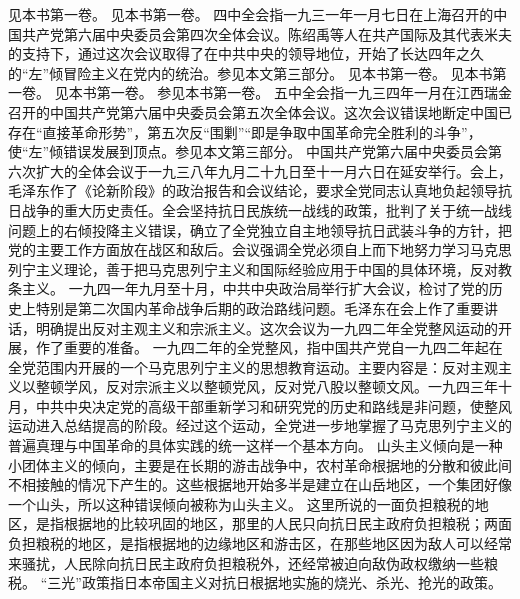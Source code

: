 \begin{maonote}
见本书第一卷。
见本书第一卷。
四中全会指一九三一年一月七日在上海召开的中国共产党第六届中央委员会第四次全体会议。陈绍禹等人在共产国际及其代表米夫的支持下，通过这次会议取得了在中共中央的领导地位，开始了长达四年之久的“左”倾冒险主义在党内的统治。参见本文第三部分。
见本书第一卷。
见本书第一卷。
见本书第一卷。
参见本书第一卷。
五中全会指一九三四年一月在江西瑞金召开的中国共产党第六届中央委员会第五次全体会议。这次会议错误地断定中国已存在“直接革命形势”，第五次反“围剿”“即是争取中国革命完全胜利的斗争”，使“左”倾错误发展到顶点。参见本文第三部分。
中国共产党第六届中央委员会第六次扩大的全体会议于一九三八年九月二十九日至十一月六日在延安举行。会上，毛泽东作了《论新阶段》的政治报告和会议结论，要求全党同志认真地负起领导抗日战争的重大历史责任。全会坚持抗日民族统一战线的政策，批判了关于统一战线问题上的右倾投降主义错误，确立了全党独立自主地领导抗日武装斗争的方针，把党的主要工作方面放在战区和敌后。会议强调全党必须自上而下地努力学习马克思列宁主义理论，善于把马克思列宁主义和国际经验应用于中国的具体环境，反对教条主义。
一九四一年九月至十月，中共中央政治局举行扩大会议，检讨了党的历史上特别是第二次国内革命战争后期的政治路线问题。毛泽东在会上作了重要讲话，明确提出反对主观主义和宗派主义。这次会议为一九四二年全党整风运动的开展，作了重要的准备。
一九四二年的全党整风，指中国共产党自一九四二年起在全党范围内开展的一个马克思列宁主义的思想教育运动。主要内容是：反对主观主义以整顿学风，反对宗派主义以整顿党风，反对党八股以整顿文风。一九四三年十月，中共中央决定党的高级干部重新学习和研究党的历史和路线是非问题，使整风运动进入总结提高的阶段。经过这个运动，全党进一步地掌握了马克思列宁主义的普遍真理与中国革命的具体实践的统一这样一个基本方向。
山头主义倾向是一种小团体主义的倾向，主要是在长期的游击战争中，农村革命根据地的分散和彼此间不相接触的情况下产生的。这些根据地开始多半是建立在山岳地区，一个集团好像一个山头，所以这种错误倾向被称为山头主义。
这里所说的一面负担粮税的地区，是指根据地的比较巩固的地区，那里的人民只向抗日民主政府负担粮税；两面负担粮税的地区，是指根据地的边缘地区和游击区，在那些地区因为敌人可以经常来骚扰，人民除向抗日民主政府负担粮税外，还经常被迫向敌伪政权缴纳一些粮税。
“三光”政策指日本帝国主义对抗日根据地实施的烧光、杀光、抢光的政策。

\end{maonote}

